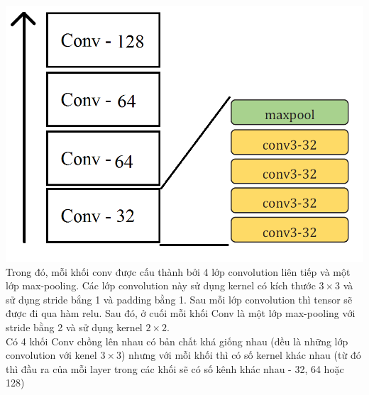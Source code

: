 \documentclass{beamer}
\begin{document}
\begin{frame}
	\includegraphics[width=0.5\linewidth]{FCN_Summary.png}\\
	Trong đó, mỗi khối conv được cấu thành bởi 4 lớp convolution liên tiếp và một lớp max-pooling. Các lớp convolution này sử dụng kernel có kích thước $3\times 3$ và sử dụng stride bắng 1 và padding bằng 1. Sau mỗi lớp convolution thì tensor sẽ được đi qua hàm relu. Sau đó, ở cuối mỗi khối Conv là một lớp max-pooling với stride bằng 2 và sử dụng kernel $ 2\times 2$.\\
	Có 4 khối Conv chồng lên nhau có bản chất khá giống nhau (đều là những lớp convolution với kenel $ 3 \times 3$) nhưng với mỗi khối thì có số kernel khác nhau (từ đó thì đầu ra của mỗi layer trong các khối sẽ có số kênh khác nhau - 32, 64 hoặc 128)
\end{frame}
\end{document}

